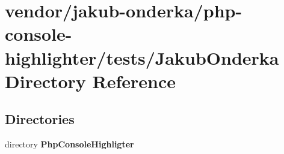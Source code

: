 \section{vendor/jakub-\/onderka/php-\/console-\/highlighter/tests/\+Jakub\+Onderka Directory Reference}
\label{dir_a9a8d8b890b657e7a99f8aab5d42d6bb}
\subsection*{Directories}
\begin{DoxyCompactItemize}
\item 
directory {\bf Php\+Console\+Highligter}
\end{DoxyCompactItemize}
